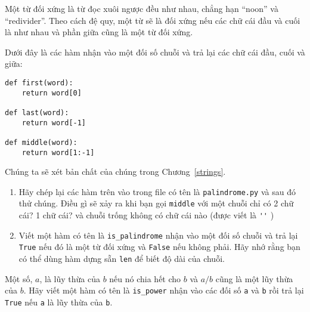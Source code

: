 \documentclass[11pt]{book}
\begin{document}
\begin{ex}
\label{palindrome}


Một từ đối xứng là từ đọc xuôi ngược đều như nhau, chẳng hạn
``noon'' và ``redivider''. Theo cách đệ quy, một từ sẽ là đối xứng
nếu các chữ cái đầu và cuối là như nhau và phần giữa cũng là
một từ đối xứng.

Dưới đây là các hàm nhận vào một đối số chuỗi và trả lại
các chữ cái đầu, cuối và giữa:

\beforeverb
\begin{verbatim}
def first(word):
    return word[0]

def last(word):
    return word[-1]

def middle(word):
    return word[1:-1]
\end{verbatim}
\afterverb
%
Chúng ta sẽ xét bản chất của chúng trong Chương~\ref{strings}.

\begin{enumerate}

\item Hãy chép lại các hàm trên vào trong file có tên là {\tt palindrome.py}
và sau đó thử chúng. Điều gì sẽ xảy ra khi bạn gọi {\tt middle} với
một chuỗi chỉ có 2 chữ cái? 1 chữ cái? và chuỗi trống không có chữ
cái nào (được viết là \verb"''" )

\item Viết một hàm có tên là \verb"is_palindrome" nhận vào
một đối số chuỗi và trả lại {\tt True} nếu đó là một từ 
đối xứng và {\tt False} nếu không phải. Hãy nhớ rằng bạn
có thể dùng hàm dựng sẵn {\tt len} để biết độ dài của chuỗi.

\end{enumerate}

\end{ex}

\begin{ex}
Một số, $a$, là lũy thừa của $b$ nếu nó chia hết cho $b$ và 
$a/b$ cũng là một lũy thừa của $b$.  Hãy viết một hàm có tên là 
\verb"is_power" nhận vào các đối số {\tt a} và {\tt b}
rồi trả lại {\tt True} nếu {\tt a} là lũy thừa của {\tt b}.
\end{ex}
\end{document}
